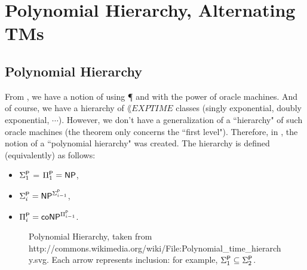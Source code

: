 \section{Polynomial Hierarchy, Alternating TMs}

\subsection{Polynomial Hierarchy}

From , we have a notion of using {\P} and {\NP} with the power of oracle machines. And of course, we have a hierarchy of $\lang{EXPTIME}$ classes (singly exponential, doubly exponential, $\cdots$). However, we don't have a generalization of a ``hierarchy" of such oracle machines (the theorem only concerns the ``first level"). Therefore, in \cite{originalpolyhierarchypaper}, the notion of a ``polynomial hierarchy" was created. The hierarchy is defined (equivalently) as follows:
\begin{itemize}
\item $\Sigma_1^\P$ = $\Pi_1^\P = \NP$,
\item $\Sigma_i^\P = \NP^{\Sigma_{i-1}^\P}$, 
\item $\Pi_i^\P = \coNP^{\Pi_{i-1}^\P}$.
\end{itemize}

\begin{figure}[!htb]
\label{fig:polyhierarchy}
\caption{Polynomial Hierarchy, taken from http://commons.wikimedia.org/wiki/File:Polynomial\_time\_hierarchy.svg. Each arrow represents inclusion: for example, $\Sigma_1^\P \subseteq \Sigma_2^\P$.}
\centering
{}
\end{figure}

